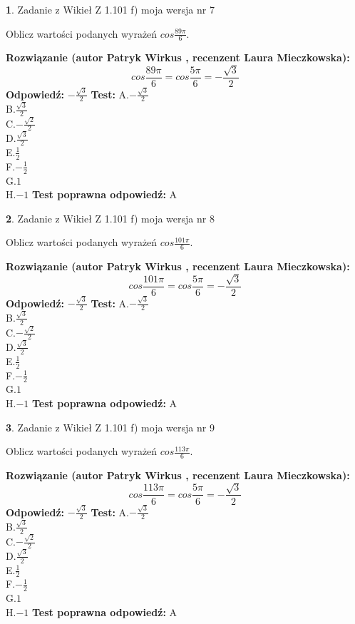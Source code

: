 \documentclass[12pt, a4paper]{article}
\theoremstyle{definition} %
\newtheorem{zad}{}
\newcommand{\zadStart}[1]{\begin{zad}#1\newline}
\newcommand{\zadStop}{\end{zad}}
\newcommand{\rozwStart}[2]{\noindent \textbf{Rozwiązanie (autor #1 , recenzent #2): }\newline}
\newcommand{\rozwStop}{\newline}
\newcommand{\odpStart}{\noindent \textbf{Odpowiedź:}\newline}
\newcommand{\odpStop}{\newline}
\newcommand{\testStart}{\noindent \textbf{Test:}\newline}
\newcommand{\testStop}{\newline}
\newcommand{\kluczStart}{\noindent \textbf{Test poprawna odpowiedź:}\newline}
\newcommand{\kluczStop}{\newline}
\begin{document}
\zadStart{Zadanie z Wikieł Z 1.101 f) moja wersja nr 7}

Oblicz wartości podanych wyrażeń $cos \frac{89\pi}{6}$.
\zadStop
\rozwStart{Patryk Wirkus}{Laura Mieczkowska}
$$cos \frac{89\pi}{6} = cos \frac{5\pi}{6} = -\frac{\sqrt{3}}{2}$$
\rozwStop
\odpStart
$-\frac{\sqrt{3}}{2}$
\odpStop
\testStart
A.$-\frac{\sqrt{3}}{2}$\\
B.$\frac{\sqrt{3}}{2}$\\
C.$-\frac{\sqrt{2}}{2}$\\
D.$\frac{\sqrt{3}}{2}$\\
E.$\frac{1}{2}$\\
F.$-\frac{1}{2}$\\
G.$1$\\
H.$-1$
\testStop
\kluczStart
A
\kluczStop



\zadStart{Zadanie z Wikieł Z 1.101 f) moja wersja nr 8}

Oblicz wartości podanych wyrażeń $cos \frac{101\pi}{6}$.
\zadStop
\rozwStart{Patryk Wirkus}{Laura Mieczkowska}
$$cos \frac{101\pi}{6} = cos \frac{5\pi}{6} = -\frac{\sqrt{3}}{2}$$
\rozwStop
\odpStart
$-\frac{\sqrt{3}}{2}$
\odpStop
\testStart
A.$-\frac{\sqrt{3}}{2}$\\
B.$\frac{\sqrt{3}}{2}$\\
C.$-\frac{\sqrt{2}}{2}$\\
D.$\frac{\sqrt{3}}{2}$\\
E.$\frac{1}{2}$\\
F.$-\frac{1}{2}$\\
G.$1$\\
H.$-1$
\testStop
\kluczStart
A
\kluczStop



\zadStart{Zadanie z Wikieł Z 1.101 f) moja wersja nr 9}

Oblicz wartości podanych wyrażeń $cos \frac{113\pi}{6}$.
\zadStop
\rozwStart{Patryk Wirkus}{Laura Mieczkowska}
$$cos \frac{113\pi}{6} = cos \frac{5\pi}{6} = -\frac{\sqrt{3}}{2}$$
\rozwStop
\odpStart
$-\frac{\sqrt{3}}{2}$
\odpStop
\testStart
A.$-\frac{\sqrt{3}}{2}$\\
B.$\frac{\sqrt{3}}{2}$\\
C.$-\frac{\sqrt{2}}{2}$\\
D.$\frac{\sqrt{3}}{2}$\\
E.$\frac{1}{2}$\\
F.$-\frac{1}{2}$\\
G.$1$\\
H.$-1$
\testStop
\kluczStart
A
\kluczStop
\end{document}
